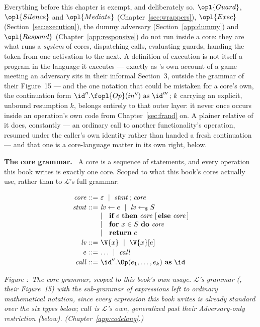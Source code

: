 \documentclass[10pt,oneside,openany]{book}
\newcounter{diagram}
\newcommand{\figcaption}[2]{%
  \par\smallskip
  \refstepcounter{diagram}\label{#1}%
  \parbox{0.92\textwidth}{\footnotesize\itshape
    \textcolor{accent}{Figure \thediagram:}\ #2\par}}
\newcommand{\heading}[1]{\medskip\par\noindent\textcolor{accent}{\textbf{#1.}}\ }
\theoremstyle{accentdef}
\theoremstyle{accentplain}
\begin{document}
Everything before this chapter is exempt, and deliberately so. $\opl{Guard}$, $\opl{Silence}$ and
$\opl{Mediate}$ (Chapter~\ref{sec:wrappers}), $\opl{Exec}$ (Section~\ref{sec:execution}), the
dummy adversary (Section~\ref{app:dummy}) and $\opl{Respond}$ (Chapter~\ref{app:responsive}) do
not run inside a core: they are what runs a \emph{system} of cores, dispatching calls, evaluating
guards, handing the token from one activation to the next. A definition of execution is not
itself a program in the language it executes --- exactly as \cite{BR06}'s own account of a game
meeting an adversary sits in their informal Section~3, outside the grammar of their Figure~15 ---
and the one notation that could be mistaken for a core's own, the continuation form
$\id''.\fopl{Op}(in'')\ \text{as}\ \id'''\,;\,k$ carrying an explicit, unbound resumption $k$,
belongs entirely to that outer layer: it never once occurs inside an operation's own code from
Chapter~\ref{sec:frand} on. A plainer relative of it does, constantly --- an ordinary call to
another functionality's operation, resumed under the caller's own identity rather than handed a
fresh continuation --- and that one is a core-language matter in its own right, below.

\heading{The core grammar} A core is a sequence of statements, and every operation this book
writes is exactly one core. Scoped to what this book's cores actually use, rather than to
$\mathcal{L}$'s full grammar:

\begin{center}
\footnotesize
\[
\begin{array}{r@{\ }c@{\ }l}
\mathit{core} & ::= & \varepsilon \ \mid\ \mathit{stmt} \,;\, \mathit{core} \\[2pt]
\mathit{stmt} & ::= & \mathit{lv} \gets e
                  \ \mid\ \mathit{lv} \gets_{\$} S \\
              &     & \mid\ \ \textbf{if}\ e\ \textbf{then}\ \mathit{core}\ [\,\textbf{else}\ \mathit{core}\,] \\
              &     & \mid\ \ \textbf{for}\ x \in S\ \textbf{do}\ \mathit{core} \\
              &     & \mid\ \ \textbf{return}\ e \\[2pt]
\mathit{lv}   & ::= & \V{x} \ \mid\ \V{x}[e] \\[2pt]
e             & ::= & \dots \ \mid\ \mathit{call} \\[2pt]
\mathit{call} & ::= & \id''.\Op(e_1,\ldots,e_k)\ \textbf{as}\ \id
\end{array}
\]
\figcaption{fig:codelang}{The core grammar, scoped to this book's own usage. $\mathcal{L}$'s
grammar (\cite{BR06}, their Figure~15) with the sub-grammar of expressions left to ordinary
mathematical notation, since every expression this book writes is already standard over the six
types below; $\mathit{call}$ is $\mathcal{L}$'s own, generalized past their Adversary-only
restriction (below). (Chapter~\ref{app:codelang}.)}
\end{center}
\end{document}

